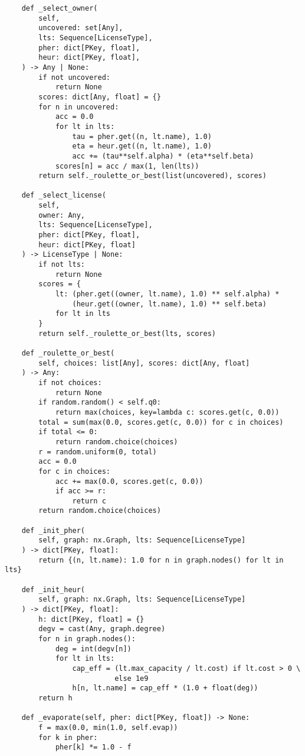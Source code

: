 \begin{verbatim}
    def _select_owner(
        self,
        uncovered: set[Any],
        lts: Sequence[LicenseType],
        pher: dict[PKey, float],
        heur: dict[PKey, float],
    ) -> Any | None:
        if not uncovered:
            return None
        scores: dict[Any, float] = {}
        for n in uncovered:
            acc = 0.0
            for lt in lts:
                tau = pher.get((n, lt.name), 1.0)
                eta = heur.get((n, lt.name), 1.0)
                acc += (tau**self.alpha) * (eta**self.beta)
            scores[n] = acc / max(1, len(lts))
        return self._roulette_or_best(list(uncovered), scores)

    def _select_license(
        self,
        owner: Any,
        lts: Sequence[LicenseType],
        pher: dict[PKey, float],
        heur: dict[PKey, float]
    ) -> LicenseType | None:
        if not lts:
            return None
        scores = {
            lt: (pher.get((owner, lt.name), 1.0) ** self.alpha) *
                (heur.get((owner, lt.name), 1.0) ** self.beta)
            for lt in lts
        }
        return self._roulette_or_best(lts, scores)

    def _roulette_or_best(
        self, choices: list[Any], scores: dict[Any, float]
    ) -> Any:
        if not choices:
            return None
        if random.random() < self.q0:
            return max(choices, key=lambda c: scores.get(c, 0.0))
        total = sum(max(0.0, scores.get(c, 0.0)) for c in choices)
        if total <= 0:
            return random.choice(choices)
        r = random.uniform(0, total)
        acc = 0.0
        for c in choices:
            acc += max(0.0, scores.get(c, 0.0))
            if acc >= r:
                return c
        return random.choice(choices)

    def _init_pher(
        self, graph: nx.Graph, lts: Sequence[LicenseType]
    ) -> dict[PKey, float]:
        return {(n, lt.name): 1.0 for n in graph.nodes() for lt in lts}

    def _init_heur(
        self, graph: nx.Graph, lts: Sequence[LicenseType]
    ) -> dict[PKey, float]:
        h: dict[PKey, float] = {}
        degv = cast(Any, graph.degree)
        for n in graph.nodes():
            deg = int(degv[n])
            for lt in lts:
                cap_eff = (lt.max_capacity / lt.cost) if lt.cost > 0 \
                          else 1e9
                h[n, lt.name] = cap_eff * (1.0 + float(deg))
        return h

    def _evaporate(self, pher: dict[PKey, float]) -> None:
        f = max(0.0, min(1.0, self.evap))
        for k in pher:
            pher[k] *= 1.0 - f


\end{verbatim}
